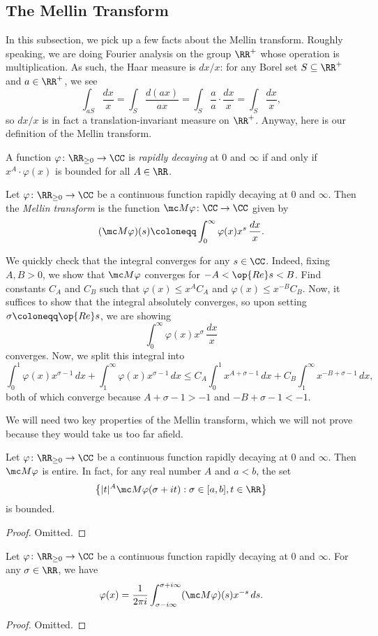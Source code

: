 \documentclass[../notes.tex]{subfiles}
\begin{document}
\subsection{The Mellin Transform}
In this subsection, we pick up a few facts about the Mellin transform. Roughly speaking, we are doing Fourier analysis on the group $\RR^+$ whose operation is multiplication. As such, the Haar measure is $dx/x$: for any Borel set $S\subseteq\RR^+$ and $a\in\RR^+$, we see
\[\int_{aS}\frac{dx}x=\int_S\frac{d(ax)}{ax}=\int_S\frac aa\cdot\frac{dx}x=\int_S\frac{dx}x,\]
so $dx/x$ is in fact a translation-invariant measure on $\RR^+$. Anyway, here is our definition of the Mellin transform.
\begin{definition}
	A function $\varphi\colon\RR_{\ge0}\to\CC$ is \textit{rapidly decaying} at $0$ and $\infty$ if and only if $x^A\cdot\varphi(x)$ is bounded for all $A\in\RR$.
\end{definition}
\begin{definition}
	Let $\varphi\colon\RR_{\ge0}\to\CC$ be a continuous function rapidly decaying at $0$ and $\infty$. Then the \textit{Mellin transform} is the function $\mc M\varphi\colon\CC\to\CC$ given by
	\[(\mc M\varphi)(s)\coloneqq\int_0^\infty\varphi(x)x^s\,\frac{dx}x.\]
\end{definition}
We quickly check that the integral converges for any $s\in\CC$. Indeed, fixing $A,B>0$, we show that $\mc M\varphi$ converges for $-A<\op{Re}s<B$. Find constants $C_A$ and $C_B$ such that $\varphi(x)\le x^{A}C_A$ and $\varphi(x)\le x^{-B}C_B$. Now, it suffices to show that the integral absolutely converges, so upon setting $\sigma\coloneqq\op{Re}s$, we are showing
\[\int_0^\infty\varphi(x)x^\sigma\,\frac{dx}x\]
converges. Now, we split this integral into
\[\int_0^1\varphi(x)x^{\sigma-1}\,dx+\int_1^\infty\varphi(x)x^{\sigma-1}\,dx\le C_A\int_0^1x^{A+\sigma-1}\,dx+C_B\int_1^\infty x^{-B+\sigma-1}\,dx,\]
both of which converge because $A+\sigma-1>-1$ and $-B+\sigma-1<-1$.

We will need two key properties of the Mellin transform, which we will not prove because they would take us too far afield.
\begin{proposition} \label{prop:bound-mellin-transform}
	Let $\varphi\colon\RR_{\ge0}\to\CC$ be a continuous function rapidly decaying at $0$ and $\infty$. Then $\mc M\varphi$ is entire. In fact, for any real number $A$ and $a<b$, the set
	\[\left\{|t|^A\mc M\varphi(\sigma+it):\sigma\in[a,b],t\in\RR\right\}\]
	is bounded.
\end{proposition}
\begin{proof}
	Omitted.
\end{proof}
\begin{theorem} \label{thm:inv-mellin}
	Let $\varphi\colon\RR_{\ge0}\to\CC$ be a continuous function rapidly decaying at $0$ and $\infty$. For any $\sigma\in\RR$, we have
	\[\varphi(x)=\frac1{2\pi i}\int_{\sigma-i\infty}^{\sigma+i\infty}(\mc M\varphi)(s)x^{-s}\,ds.\]
\end{theorem}
\begin{proof}
	Omitted.
\end{proof}
\end{document}
